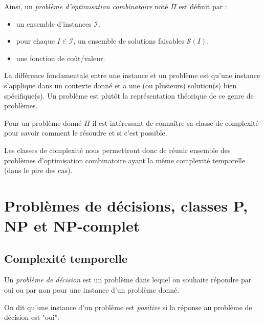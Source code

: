 \begin{definition}
    Ainsi, un \emph{problème d'optimisation combinatoire} noté $\Pi$ est définit par : 
    \begin{itemize}
        \item un ensemble d'instances $ \mathcal{I}$.
        \item pour chaque $ I \in \mathcal{I}$, un ensemble de solutions faisables $ \mathcal{S}(I)$.
        \item une fonction de coût/valeur.
    \end{itemize}
\end{definition}

\begin{remark}
    La différence fondamentale entre une instance et un problème est qu'une instance s'applique dans un 
    contexte donné et a une (ou plusieurs) solution(s) bien spécifique(s).
    Un problème est plutôt la représentation théorique de ce genre de problèmes. 
\end{remark}

Pour un problème donné $ \Pi$ il est intéressant de connaître sa classe de complexité pour savoir comment 
le résoudre et si c'est possible.

Les classes de complexité nous permettront donc de réunir ensemble des problèmes d'optimisation combinatoire 
ayant la même complexité temporelle (dans le pire des cas). 


\section{Problèmes de décisions, classes P, NP et NP-complet}

\subsection{Complexité temporelle}

\begin{definition}
    Un \emph{problème de décision} est un problème dans lequel on souhaite 
    répondre par oui ou par non pour une instance d'un problème donné.

    \medskip 

    On dit qu'une instance d'un problème est \emph{positive} si la réponse au problème 
    de décision est "oui".
\end{definition}

